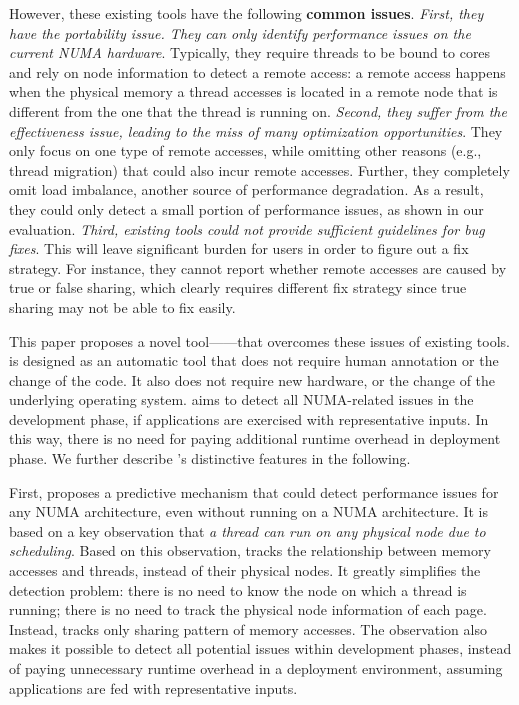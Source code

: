 However, these existing tools have the following \textbf{common issues}. \textit{First, they have the portability issue. They can only identify performance issues on the current NUMA hardware}. 
Typically, they require threads to be bound to cores and rely on  node information to detect a remote access: a remote access happens when the physical memory a thread accesses is located in a remote node that is different from the one that the thread is running on. \textit{Second, they suffer from the effectiveness issue, leading to the miss of many optimization opportunities}. They only focus on one type of remote accesses, while omitting other reasons (e.g., thread migration) that could also incur remote accesses. Further, they completely omit load imbalance, another source of performance degradation. As a result, they could only detect a small portion of performance issues, as shown in our evaluation. \textit{Third, existing tools could not provide sufficient guidelines for bug fixes}. This will leave significant burden for users in order to figure out a fix strategy. For instance, they cannot report whether remote accesses are caused by true or false sharing, which clearly requires different fix strategy since true sharing may not be able to fix easily.   


This paper proposes a novel tool---\NP{}---that overcomes these issues of existing tools. \NP{} is designed as an automatic tool that does not require human annotation or the change of the code. It also does not require new hardware, or the change of the underlying operating system. \NP{} aims to detect all NUMA-related issues in the development phase, if applications are exercised with representative inputs. In this way, there is no need for paying additional runtime overhead in deployment phase. We further describe \NP{}'s distinctive features in the following. 

First, \NP{} proposes a predictive mechanism that could detect performance issues for any NUMA architecture, even without running on a NUMA architecture. It is based on a key observation that \textit{a thread can run on any physical node due to scheduling}. Based on this observation, \NP{} tracks the relationship between memory accesses and threads, instead of their physical nodes. It greatly simplifies the detection problem: there is no need to know the node on which a thread is running; there is no need to track the physical node information of each page. Instead, \NP{} tracks only sharing pattern of memory accesses. The observation also makes it possible to detect all potential issues within development phases, instead of paying unnecessary runtime overhead in a deployment environment, assuming applications are fed with representative inputs. 


